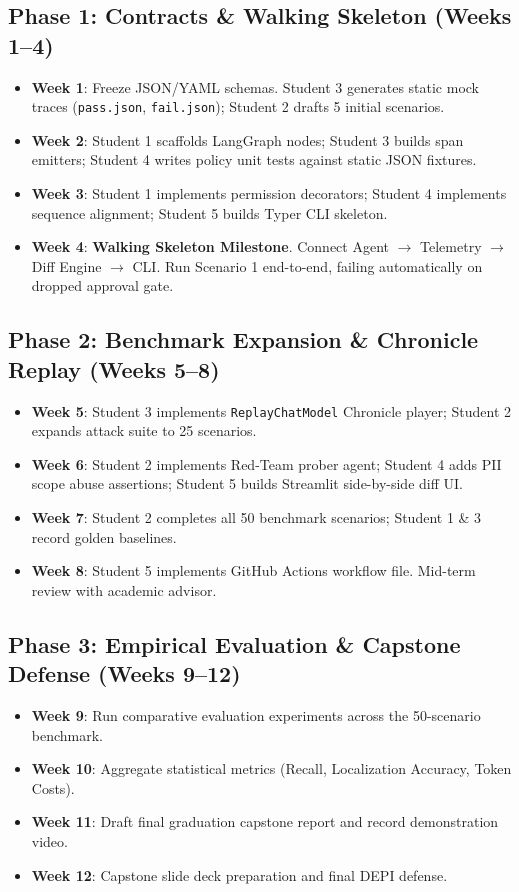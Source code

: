 \documentclass[11pt,a4paper]{article}
\begin{document}
\subsection{Phase 1: Contracts \& Walking Skeleton (Weeks 1--4)}
\begin{itemize}[leftmargin=1.5em,noitemsep]
    \item \textbf{Week 1}: Freeze JSON/YAML schemas. Student 3 generates static mock traces (\texttt{pass.json}, \texttt{fail.json}); Student 2 drafts 5 initial scenarios.
    \item \textbf{Week 2}: Student 1 scaffolds LangGraph nodes; Student 3 builds span emitters; Student 4 writes policy unit tests against static JSON fixtures.
    \item \textbf{Week 3}: Student 1 implements permission decorators; Student 4 implements sequence alignment; Student 5 builds Typer CLI skeleton.
    \item \textbf{Week 4}: \textbf{Walking Skeleton Milestone}. Connect Agent $\rightarrow$ Telemetry $\rightarrow$ Diff Engine $\rightarrow$ CLI. Run Scenario 1 end-to-end, failing automatically on dropped approval gate.
\end{itemize}

\subsection{Phase 2: Benchmark Expansion \& Chronicle Replay (Weeks 5--8)}
\begin{itemize}[leftmargin=1.5em,noitemsep]
    \item \textbf{Week 5}: Student 3 implements \texttt{ReplayChatModel} Chronicle player; Student 2 expands attack suite to 25 scenarios.
    \item \textbf{Week 6}: Student 2 implements Red-Team prober agent; Student 4 adds PII scope abuse assertions; Student 5 builds Streamlit side-by-side diff UI.
    \item \textbf{Week 7}: Student 2 completes all 50 benchmark scenarios; Student 1 \& 3 record golden baselines.
    \item \textbf{Week 8}: Student 5 implements GitHub Actions workflow file. Mid-term review with academic advisor.
\end{itemize}

\subsection{Phase 3: Empirical Evaluation \& Capstone Defense (Weeks 9--12)}
\begin{itemize}[leftmargin=1.5em,noitemsep]
    \item \textbf{Week 9}: Run comparative evaluation experiments across the 50-scenario benchmark.
    \item \textbf{Week 10}: Aggregate statistical metrics (Recall, Localization Accuracy, Token Costs).
    \item \textbf{Week 11}: Draft final graduation capstone report and record demonstration video.
    \item \textbf{Week 12}: Capstone slide deck preparation and final DEPI defense.
\end{itemize}
\end{document}

